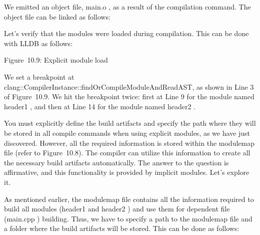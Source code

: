 We emitted an object file, main.o , as a result of the compilation command. The object file can be linked as follows:


Let's verify that the modules were loaded during compilation. This can be done with LLDB as follows:


\begin{center}
Figure 10.9: Explicit module load
\end{center}

We set a breakpoint at clang::CompilerInstance::findOrCompileModuleAndReadAST, as shown in Line 3 of Figure 10.9. We hit the breakpoint twice: first at Line 9 for the module named header1 , and then at Line 14 for the module named header2 .

You must explicitly define the build artifacts and specify the path where they will be stored in all compile commands when using explicit modules, as we have just discovered. However, all the required information is stored within the modulemap file (refer to Figure 10.8). The compiler can utilize this information to create all the necessary build artifacts automatically. The answer to the question is affirmative, and this functionality is provided by implicit modules. Let's explore it.


As mentioned earlier, the modulemap file contains all the information required to build all modules (header1 and header2 ) and use them for dependent file (main.cpp ) building. Thus, we have to specify a path to the modulemap file and a folder where the build artifacts will be stored. This can be done as follows:

